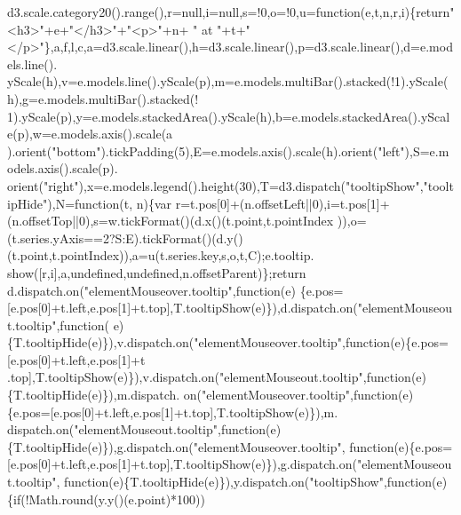 \begin{DoxyCode}
      d3.scale.category20().range(),r=null,i=null,s=!0,o=!0,u=\textcolor{keyword}{function}(e,t,n,r,i)\{\textcolor{keywordflow}{return}\textcolor{stringliteral}{"<h3>"}+e+\textcolor{stringliteral}{"</h3>"}+\textcolor{stringliteral}{"<p>"}+n+\textcolor{stringliteral}{
      " at "}+t+\textcolor{stringliteral}{"</p>"}\},a,f,l,c,a=d3.scale.linear(),h=d3.scale.linear(),p=d3.scale.linear(),d=e.models.line().
      yScale(h),v=e.models.line().yScale(p),m=e.models.multiBar().stacked(!1).yScale(h),g=e.models.multiBar().stacked(!
      1).yScale(p),y=e.models.stackedArea().yScale(h),b=e.models.stackedArea().yScale(p),w=e.models.axis().scale(a
      ).orient(\textcolor{stringliteral}{"bottom"}).tickPadding(5),E=e.models.axis().scale(h).orient(\textcolor{stringliteral}{"left"}),S=e.models.axis().scale(p).
      orient(\textcolor{stringliteral}{"right"}),x=e.models.legend().height(30),T=d3.dispatch(\textcolor{stringliteral}{"tooltipShow"},\textcolor{stringliteral}{"tooltipHide"}),N=\textcolor{keyword}{function}(t,
      n)\{var r=t.pos[0]+(n.offsetLeft||0),i=t.pos[1]+(n.offsetTop||0),s=w.tickFormat()(d.x()(t.point,t.pointIndex
      )),o=(t.series.yAxis==2?S:E).tickFormat()(d.y()(t.point,t.pointIndex)),a=u(t.series.key,s,o,t,C);e.tooltip.
      show([r,i],a,undefined,undefined,n.offsetParent)\};\textcolor{keywordflow}{return} d.dispatch.on(\textcolor{stringliteral}{"elementMouseover.tooltip"},\textcolor{keyword}{function}(e)
      \{e.pos=[e.pos[0]+t.left,e.pos[1]+t.top],T.tooltipShow(e)\}),d.dispatch.on(\textcolor{stringliteral}{"elementMouseout.tooltip"},\textcolor{keyword}{function}(
      e)\{T.tooltipHide(e)\}),v.dispatch.on(\textcolor{stringliteral}{"elementMouseover.tooltip"},\textcolor{keyword}{function}(e)\{e.pos=[e.pos[0]+t.left,e.pos[1]+t
      .top],T.tooltipShow(e)\}),v.dispatch.on(\textcolor{stringliteral}{"elementMouseout.tooltip"},\textcolor{keyword}{function}(e)\{T.tooltipHide(e)\}),m.dispatch.
      on(\textcolor{stringliteral}{"elementMouseover.tooltip"},\textcolor{keyword}{function}(e)\{e.pos=[e.pos[0]+t.left,e.pos[1]+t.top],T.tooltipShow(e)\}),m.
      dispatch.on(\textcolor{stringliteral}{"elementMouseout.tooltip"},\textcolor{keyword}{function}(e)\{T.tooltipHide(e)\}),g.dispatch.on(\textcolor{stringliteral}{"elementMouseover.tooltip"},\textcolor{keyword}{
      function}(e)\{e.pos=[e.pos[0]+t.left,e.pos[1]+t.top],T.tooltipShow(e)\}),g.dispatch.on(\textcolor{stringliteral}{"elementMouseout.tooltip"},\textcolor{keyword}{
      function}(e)\{T.tooltipHide(e)\}),y.dispatch.on(\textcolor{stringliteral}{"tooltipShow"},\textcolor{keyword}{function}(e)\{\textcolor{keywordflow}{if}(!Math.round(y.y()(e.point)*100))\textcolor{keywordflow}{
}
\end{DoxyCode}

